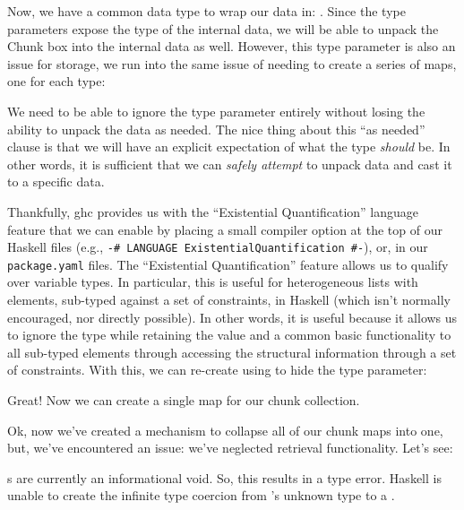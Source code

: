 \badUniversalChunkCarriage{}

Now, we have a common data type to wrap our data in: \Chunk{}. Since the type
parameters expose the type of the internal data, we will be able to unpack the
Chunk box into the internal data as well. However, this type parameter is also
an issue for storage, we run into the same issue of needing to create a series
of maps, one for each type:

\showingBadChunkWouldFailChunkDB{}

We need to be able to ignore the type parameter entirely without losing the
ability to unpack the data as needed. The nice thing about this ``as needed''
clause is that we will have an explicit expectation of what the type
\textit{should} be. In other words, it is sufficient that we can \textit{safely
attempt} to unpack data and cast it to a specific data.

Thankfully, \acs{ghc} provides us with the ``Existential Quantification''
language feature \cite{GHC2020ExistentialQuantification} that we can enable by
placing a small compiler option at the top of our Haskell files (e.g.,
\texttt{{-# LANGUAGE ExistentialQuantification #-}}), or, in our
\texttt{package.yaml} files. The ``Existential Quantification'' feature allows
us to qualify over variable types. In  particular, this is useful for
heterogeneous lists with elements, sub-typed against a set of constraints, in
Haskell (which isn't normally encouraged, nor directly possible). In other
words, it is useful because it allows us to ignore the type while retaining the
value and a common basic functionality to all sub-typed elements through
accessing the structural information through a set of constraints. With this, we
can re-create \Chunk{} using \ExistentialQuantification{} to hide the type
parameter:

\voidDataChunks{}

Great! Now we can create a single map for our chunk collection.

\voidDataChunkDB{}

Ok, now we've created a mechanism to collapse all of our chunk maps into one,
but, we've encountered an issue: we've neglected retrieval functionality. Let's
see:

\brokenChunkRetriever{}

\Chunk{}s are currently an informational void. So, this results in a type
error. Haskell is unable to create the infinite
type coercion from 's unknown type to a \QuantityDict{}.

